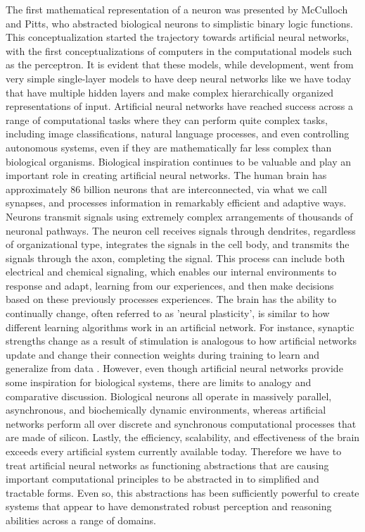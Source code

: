 The first mathematical representation of a neuron was presented by McCulloch and Pitts, who abstracted biological neurons to simplistic binary logic functions. This conceptualization started the trajectory towards artificial neural networks, with the first conceptualizations of computers in the computational models such as the perceptron. It is evident that these models, while development, went from very simple single-layer models to have deep neural networks like we have today that have multiple hidden layers and make complex hierarchically organized representations of input. Artificial neural networks have reached success across a range of computational tasks where they can perform quite complex tasks, including image classifications, natural language processes, and even controlling autonomous systems, even if they are mathematically far less complex than biological organisms.
Biological inspiration continues to be valuable and play an important role in creating artificial neural networks. The human brain has approximately 86 billion neurons that are interconnected, via what we call synapses, and processes information in remarkably efficient and adaptive ways. Neurons transmit signals using extremely complex arrangements of thousands of neuronal pathways. The neuron cell receives signals through dendrites, regardless of organizational type, integrates the signals in the cell body, and transmits the signals through the axon, completing the signal. This process can include both electrical and chemical signaling, which enables our internal environments to response and adapt, learning from our experiences, and then make decisions based on these previously processes experiences. The brain has the ability to continually change, often referred to as 'neural plasticity', is similar to how different learning algorithms work in an artificial network. For instance, synaptic strengths change as a result of stimulation is analogous to how artificial networks update and change their connection weights during training to learn and generalize from data \cite{mcculloch1943logical}.
However, even though artificial neural networks provide some inspiration for biological systems, there are limits to analogy and comparative discussion. Biological neurons all operate in massively parallel, asynchronous, and biochemically dynamic environments, whereas artificial networks perform all over discrete and synchronous computational processes that are made of silicon. Lastly, the efficiency, scalability, and effectiveness of the brain exceeds every artificial system currently available today. Therefore we have to treat artificial neural networks as functioning abstractions that are causing important computational principles to be abstracted in to simplified and tractable forms. Even so, this abstractions has been sufficiently powerful to create systems that appear to have demonstrated robust perception and reasoning abilities across a range of domains.








